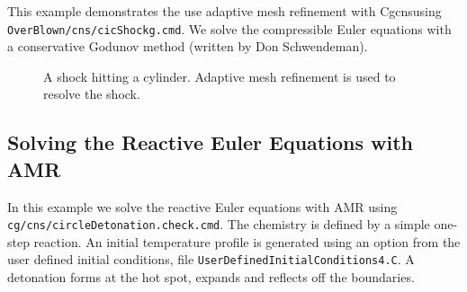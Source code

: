 \documentclass{article}
\newcommand{\obFigures}{\homeHenshaw/res/OverBlown/docFigures}  %
\newcommand{\Solver}{Cgcns}
\begin{document}
This example demonstrates the use adaptive mesh refinement with \Solver using {\tt OverBlown/cns/cicShockg.cmd}.
We solve the compressible Euler equations with a conservative Godunov method (written by Don Schwendeman).


{
\newcommand{\figWidth}{7.27cm}
\newcommand{\trimfig}[2]{\trimPlot{#1}{#2}{.0}{.0}{.0}{.0}}
\newcommand{\figWidtha}{8cm}
\newcommand{\trimfiga}[2]{\trimPlot{#1}{#2}{.0}{.0}{.1}{.0}}
\begin{figure}[hbt]
\begin{center}
\end{center}
 \caption{A shock hitting a cylinder. Adaptive mesh refinement is used to resolve the shock.}
\end{figure}
}



\clearpage
\subsection{Solving the Reactive Euler Equations with AMR}

In this example we solve the reactive Euler equations with AMR using
{\tt cg/cns/circleDetonation.check.cmd}. The chemistry is defined by a simple one-step
reaction. An initial temperature profile
is generated using an option from the user defined initial conditions, file {\tt UserDefinedInitialConditions4.C}.
A detonation forms at the hot spot, expands and reflects off the boundaries.
\end{document}
